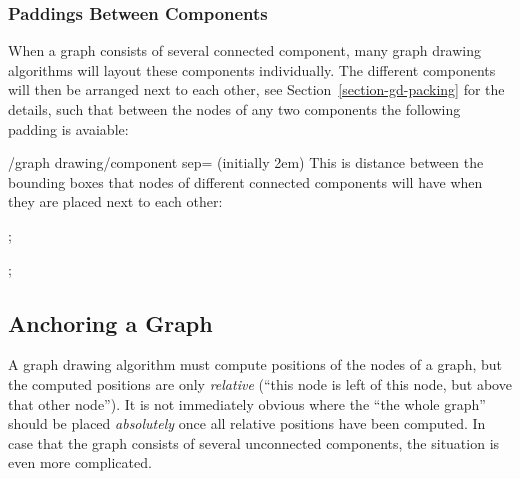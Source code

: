 {\subsubsection{Paddings Between Components}

When a graph consists of several connected component, many graph
drawing algorithms will layout these components individually. The
different components will then be arranged next to each other, see
Section~\ref{section-gd-packing} for the details, such that between
the nodes of any two components the following padding is avaiable:

\begin{key}{/graph drawing/component sep= (initially 2em)}
  This is distance between the bounding boxes that nodes of different
  connected components will have when they are placed next to each
  other:
\begin{codeexample}[]
\tikz {};  
\end{codeexample}
\begin{codeexample}[]
\tikz {};  
\end{codeexample}
\end{key}



\subsection{Anchoring a Graph}

\label{subsection-library-graphdrawing-anchoring}

A graph drawing algorithm must compute positions of the nodes of a
graph, but the computed positions are only \emph{relative} (``this
node is left of this node, but above that other node''). It is not
immediately obvious where the ``the whole graph'' should be placed
\emph{absolutely} once all relative positions have been computed. In
case that the graph consists of several unconnected components, the
situation is even more complicated.

}
